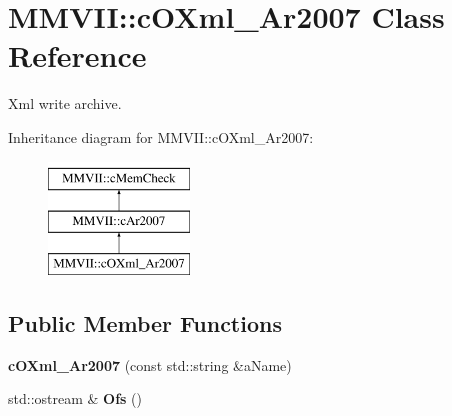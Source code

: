 \hypertarget{classMMVII_1_1cOXml__Ar2007}{}\section{M\+M\+V\+II\+:\+:c\+O\+Xml\+\_\+\+Ar2007 Class Reference}
\label{classMMVII_1_1cOXml__Ar2007}


Xml write archive.  


Inheritance diagram for M\+M\+V\+II\+:\+:c\+O\+Xml\+\_\+\+Ar2007\+:\begin{figure}[H]
\begin{center}
\leavevmode
\includegraphics[height=3.000000cm]{classMMVII_1_1cOXml__Ar2007}
\end{center}
\end{figure}
\subsection*{Public Member Functions}
\begin{DoxyCompactItemize}
\item 
{\bfseries c\+O\+Xml\+\_\+\+Ar2007} (const std\+::string \&a\+Name)\hypertarget{classMMVII_1_1cOXml__Ar2007_af352f16c51020ec29f94461d659c3ac4}{}\label{classMMVII_1_1cOXml__Ar2007_af352f16c51020ec29f94461d659c3ac4}

\item 
std\+::ostream \& {\bfseries Ofs} ()\hypertarget{classMMVII_1_1cOXml__Ar2007_af01271a5b3fba19dccd26e8c56f1c789}{}\label{classMMVII_1_1cOXml__Ar2007_af01271a5b3fba19dccd26e8c56f1c789}

\end{DoxyCompactItemize}
